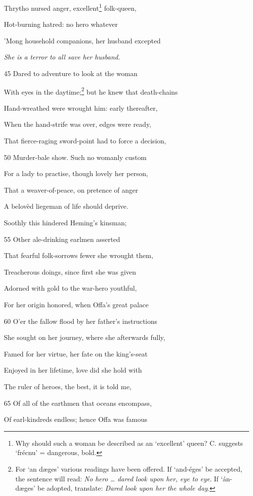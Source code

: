 Thrytho nursed anger, excellent\footnote{Why should such a woman be described as an ‘excellent’ queen? C.
suggests ‘frécnu’ = dangerous, bold.} folk-queen,

Hot-burning hatred: no hero whatever

’Mong household companions, her husband excepted

\emph{She is a terror to
all save her husband.}

45
Dared to adventure to look at the woman

With eyes in the daytime;\footnote{For ‘an dæges’ various readings have been offered. If ‘and-éges’ be
accepted, the sentence will read: \emph{No hero … dared look upon her, eye to eye}.
If ‘án-dæges’ be adopted, translate: \emph{Dared look upon her the whole day}.} but he knew that death-chains

Hand-wreathed were wrought him: early thereafter,

When the hand-strife was over, edges were ready,

That fierce-raging sword-point had to force a decision,

50
Murder-bale show. Such no womanly custom

For a lady to practise, though lovely her person,

That a weaver-of-peace, on pretence of anger

A belovèd liegeman of life should deprive.

Soothly this hindered Heming’s kinsman;

55
Other ale-drinking earlmen asserted

That fearful folk-sorrows fewer she wrought them,

Treacherous doings, since first she was given

Adorned with gold to the war-hero youthful,

For her origin honored, when Offa’s great palace

60
O’er the fallow flood by her father’s instructions

She sought on her journey, where she afterwards fully,

Famed for her virtue, her fate on the king’s-seat

Enjoyed in her lifetime, love did she hold with

The ruler of heroes, the best, it is told me,

65
Of all of the earthmen that oceans encompass,

Of earl-kindreds endless; hence Offa was famous

